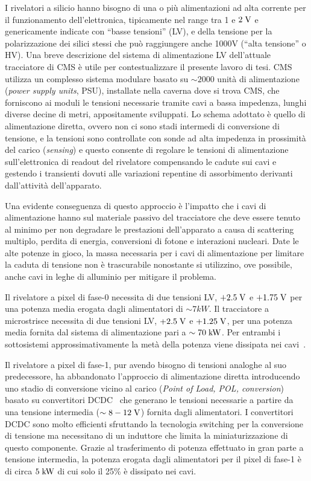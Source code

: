 I rivelatori a silicio hanno bisogno di una o pi\`u alimentazioni ad alta corrente per il funzionamento dell'elettronica, tipicamente nel range tra 1 e $2\rm \; V$ e genericamente indicate con ``basse tensioni'' (LV), e della tensione per la polarizzazione dei silici stessi che pu\`o raggiungere anche 1000V (``alta tensione'' o HV). Una breve descrizione del sistema di alimentazione LV dell'attuale tracciatore di CMS \`e utile per contestualizzare il presente lavoro di tesi. CMS utilizza un complesso sistema modulare basato su $\sim 2000$ unit\`a di alimentazione ({\em power supply units}, PSU), installate nella caverna dove si trova CMS, che forniscono ai moduli le tensioni necessarie tramite cavi a bassa impedenza, lunghi diverse decine di metri,
appositamente sviluppati. Lo schema adottato \`e quello di alimentazione diretta, ovvero non ci sono stadi intermedi di conversione di tensione, e la tensioni sono controllate con sonde ad alta impedenza in prossimit\`a del carico ({\em sensing}) e questo consente di regolare le tensioni di alimentazione sull’elettronica di readout del rivelatore compensando le cadute sui cavi e gestendo i transienti dovuti alle variazioni repentine di assorbimento derivanti dall'attivit\`a dell'apparato.

Una evidente conseguenza di questo approccio \`e l'impatto che i cavi di alimentazione hanno sul materiale passivo del tracciatore che deve essere tenuto al minimo per non degradare le prestazioni dell'apparato a causa di scattering multiplo, perdita di energia, conversioni di fotone e interazioni nucleari.  
Date le alte potenze in gioco, la massa necessaria per i cavi di alimentazione per limitare la caduta di tensione non \`e trascurabile nonostante si utilizzino, ove possibile, anche cavi in leghe di alluminio per mitigare il problema.

Il rivelatore a pixel di fase-0 necessita di due tensioni LV, $+2.5\rm \; V$ e $+1.75\rm \; V$ per una potenza media erogata dagli alimentatori di $\sim 7kW$. Il tracciatore a microstrisce necessita di due tensioni LV, $+2.5\rm \; V$ e $+1.25\rm \; V$, per una potenza media fornita dal sistema di alimentazione pari a $\sim 70\rm \; kW$. Per entrambi i sottosistemi approssimativamente la met\`a della potenza viene dissipata nei cavi~\cite{Paoletti:power}.

Il rivelatore a pixel di fase-1, pur avendo bisogno di tensioni analoghe al suo predecessore, ha abbandonato l'approccio di alimentazione diretta introducendo uno stadio di conversione vicino al carico ({\em Point of Load, POL, conversion}) basato su convertitori DCDC~\cite{DCDC} che generano le tensioni necessarie a partire da una tensione intermedia ($\sim 8-12\rm \; V$) fornita dagli alimentatori. I convertitori DCDC sono molto efficienti sfruttando la tecnologia switching per la conversione di tensione ma necessitano di un induttore che limita la miniaturizzazione di questo componente. Grazie al trasferimento di potenza effettuato in gran parte a tensione intermedia, la potenza erogata dagli alimentatori per il pixel di fase-1 \`e di circa $5\rm \; kW$ di cui solo il 25\% \`e dissipato nei cavi.

